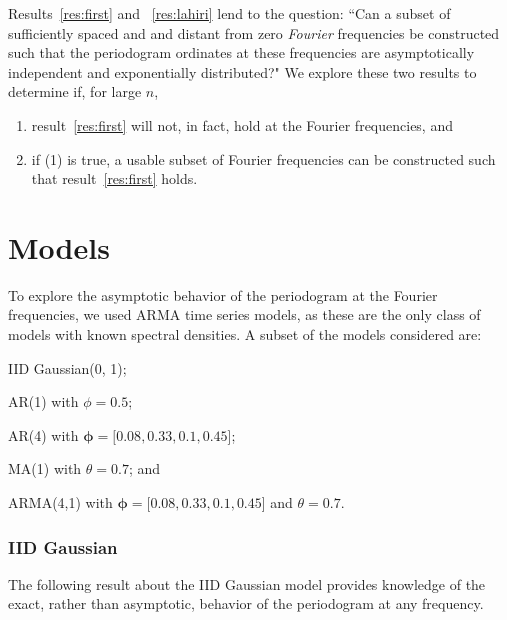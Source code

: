 \documentclass{article}\usepackage[]{graphicx}\usepackage[]{color}
\theoremstyle{plain}
\begin{document}
Results~\ref{res:first} and ~\ref{res:lahiri} lend to the question: ``Can a subset of sufficiently spaced and and distant from zero \textit{Fourier} frequencies be constructed such that the periodogram ordinates at these frequencies are asymptotically independent and exponentially distributed?" We explore these two results to determine if, for large $n$,
\begin{enumerate}
  \item result~\ref{res:first} will not, in fact, hold at the Fourier frequencies, and
  \item if (1) is true, a usable subset of Fourier frequencies can be constructed such that result~\ref{res:first} holds.
\end{enumerate}




\section{Models}\label{sec:models}

To explore the asymptotic behavior of the periodogram at the Fourier frequencies, we used ARMA time series models, as these are the only class of models with known spectral densities. A subset of the models considered are: \begin{inparaenum}
\item IID Gaussian(0, 1);
\item AR(1) with $\phi = 0.5$; 
\item AR(4) with $\boldsymbol{\phi} = [0.08, 0.33, 0.1, 0.45$];
\item MA(1) with $\theta = 0.7$; and
\item ARMA(4,1) with $\boldsymbol{\phi} = [0.08, 0.33, 0.1, 0.45$] and $\theta = 0.7$.
\end{inparaenum}

\subsubsection*{IID Gaussian}
The following result about the IID Gaussian model provides knowledge of the exact, rather than asymptotic, behavior of the periodogram at any frequency.
\end{document}
